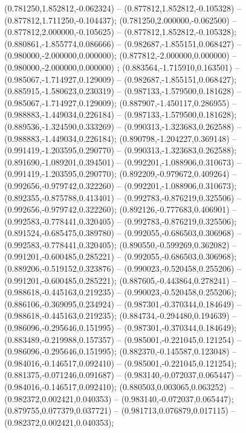  (0.781250,1.852812,-0.062324) -- (0.877812,1.852812,-0.105328) -- (0.877812,1.711250,-0.104437);
 (0.781250,2.000000,-0.062500) -- (0.877812,2.000000,-0.105625) -- (0.877812,1.852812,-0.105328);
 (0.880861,-1.855774,0.086666) -- (0.982687,-1.855151,0.068427) -- (0.980000,-2.000000,0.000000);
 (0.877812,-2.000000,0.000000) -- (0.980000,-2.000000,0.000000) ;
 (0.883564,-1.715910,0.163501) -- (0.985067,-1.714927,0.129009) -- (0.982687,-1.855151,0.068427);
 (0.885915,-1.580623,0.230319) -- (0.987133,-1.579500,0.181628) -- (0.985067,-1.714927,0.129009);
 (0.887907,-1.450117,0.286955) -- (0.988883,-1.449034,0.226184) -- (0.987133,-1.579500,0.181628);
 (0.889536,-1.324590,0.333269) -- (0.990313,-1.323683,0.262588) -- (0.988883,-1.449034,0.226184);
 (0.890798,-1.204227,0.369148) -- (0.991419,-1.203595,0.290770) -- (0.990313,-1.323683,0.262588);
 (0.891690,-1.089201,0.394501) -- (0.992201,-1.088906,0.310673) -- (0.991419,-1.203595,0.290770);
 (0.892209,-0.979672,0.409264) -- (0.992656,-0.979742,0.322260) -- (0.992201,-1.088906,0.310673);
 (0.892355,-0.875788,0.413401) -- (0.992783,-0.876219,0.325506) -- (0.992656,-0.979742,0.322260);
 (0.892126,-0.777683,0.406901) -- (0.992583,-0.778441,0.320405) -- (0.992783,-0.876219,0.325506);
 (0.891524,-0.685475,0.389780) -- (0.992055,-0.686503,0.306968) -- (0.992583,-0.778441,0.320405);
 (0.890550,-0.599269,0.362082) -- (0.991201,-0.600485,0.285221) -- (0.992055,-0.686503,0.306968);
 (0.889206,-0.519152,0.323876) -- (0.990023,-0.520458,0.255206) -- (0.991201,-0.600485,0.285221);
 (0.887605,-0.443864,0.278241) -- (0.988618,-0.445163,0.219235) -- (0.990023,-0.520458,0.255206);
 (0.886106,-0.369095,0.234924) -- (0.987301,-0.370344,0.184649) -- (0.988618,-0.445163,0.219235);
 (0.884734,-0.294480,0.194639) -- (0.986096,-0.295646,0.151995) -- (0.987301,-0.370344,0.184649);
 (0.883489,-0.219988,0.157357) -- (0.985001,-0.221045,0.121254) -- (0.986096,-0.295646,0.151995);
 (0.882370,-0.145587,0.123048) -- (0.984016,-0.146517,0.092410) -- (0.985001,-0.221045,0.121254);
 (0.881375,-0.071246,0.091687) -- (0.983140,-0.072037,0.065447) -- (0.984016,-0.146517,0.092410);
 (0.880503,0.003065,0.063252) -- (0.982372,0.002421,0.040353) -- (0.983140,-0.072037,0.065447);
 (0.879755,0.077379,0.037721) -- (0.981713,0.076879,0.017115) -- (0.982372,0.002421,0.040353);
